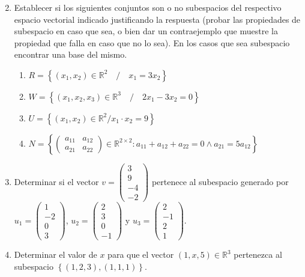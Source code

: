 \documentclass[12pt]{article}
\begin{document}
\begin{enumerate}
\begin{multicols}{2}
  \end{multicols}
  \item Establecer si los siguientes conjuntos son o no subespacios del respectivo espacio vectorial indicado justificando la respuesta (probar las propiedades de subespacio en caso que sea, o bien dar un contraejemplo que muestre la propiedad que falla en caso que no lo sea). En los casos que sea subespacio encontrar una base del mismo.
    \begin{enumerate}
      \item $R = \left\{(x_1,x_2) \in \mathbb{R}^2\quad /\quad x_1 = 3x_2\right\}$
      \item $W = \left\{(x_1,x_2,x_3) \in \mathbb{R}^3\quad /\quad 2x_1 - 3x_2 = 0\right\}$
      \item $U = \left\{(x_1,x_2) \in \mathbb{R}^2 / x_1\cdot x_2 = 9\right\}$
      \item $N=\left\{\begin{pmatrix}
      a_{11} & a_{12}\\
      a_{21} & a_{22}
    \end{pmatrix} \in \mathbb{R}^{2\times2}:a_{11}+a_{12}+a_{22}=0 \wedge a_{21}=5a_{12}\right\}$
    \end{enumerate}            
  \item Determinar si el vector $v=\begin{pmatrix}
  3\\
  9\\
  -4\\
  -2
  \end{pmatrix}$ pertenece al subespacio generado por $u_1=\begin{pmatrix}
  1\\
  -2\\
  0\\
  3\end{pmatrix}$, $u_2 = \begin{pmatrix}
    2\\
    3\\
    0\\
    -1
  \end{pmatrix}$ y $u_3 = \begin{pmatrix}
    2\\
    -1\\
    2\\
    1
  \end{pmatrix}$.
  \item Determinar el valor de $x$ para que el vector $(1, x, 5) \in \mathbb{R}^3$ pertenezca al subespacio $\left\{(1, 2, 3), (1, 1, 1)\right\}$.

\end{enumerate}
\end{document}
